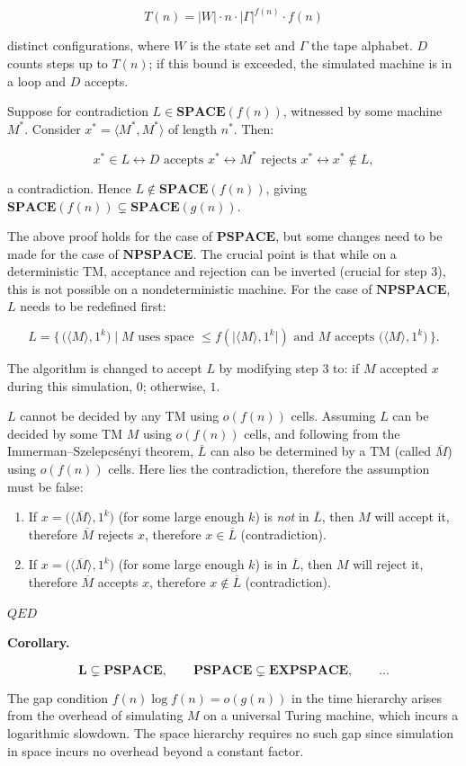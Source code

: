 \documentclass[12pt,a4paper,openany]{article}
\begin{document}
\[
T(n) = |W| \cdot n \cdot |\Gamma|^{f(n)} \cdot f(n)
\]

distinct configurations, where $W$ is the state set and $\Gamma$ the tape alphabet.
$D$ counts steps up to $T(n)$; if this bound is exceeded, the simulated machine
is in a loop and $D$ accepts.

Suppose for contradiction $L \in \mathbf{SPACE}(f(n))$, witnessed by some machine $M^*$.
Consider $x^* = \langle M^*, M^* \rangle$ of length $n^*$. Then:

\[
x^* \in L \leftrightarrow D \text{ accepts } x^* \leftrightarrow M^* \text{ rejects } x^* \leftrightarrow x^* \notin L,
\]

a contradiction. Hence $L \notin \mathbf{SPACE}(f(n))$, giving
$\mathbf{SPACE}(f(n)) \subsetneq \mathbf{SPACE}(g(n))$.

The above proof holds for the case of $\mathbf{PSPACE}$, but some changes need
to be made for the case of $\mathbf{NPSPACE}$. The crucial point is that while
on a deterministic TM, acceptance and rejection can be inverted (crucial for
step 3), this is not possible on a nondeterministic machine.
For the case of $\mathbf{NPSPACE}$, $L$ needs to be redefined first:

\[
L = \Big\{\, \big(\langle M \rangle, 1^k\big)  \mid
M \text{ uses space } \leq f\!\left(\big|\langle M \rangle, 1^k\big|\right)
\text{ and } M \text{ accepts } \big(\langle M \rangle, 1^k\big) \,\Big\}.
\]

The algorithm is changed to accept $L$ by modifying step 3 to: if $M$ accepted
$x$ during this simulation, $0$; otherwise, $1$.

$L$ cannot be decided by any TM using $o(f(n))$ cells. Assuming $L$ can be
decided by some TM $M$ using $o(f(n))$ cells, and following from the
Immerman--Szelepcs\'enyi theorem, $\overline{L}$ can also be determined by a
TM (called $\overline{M}$) using $o(f(n))$ cells. Here lies the contradiction,
therefore the assumption must be false:

\begin{enumerate}
    \item If $x = \big(\langle \overline{M} \rangle, 1^k\big)$ (for some large
    enough $k$) is \emph{not} in $\overline{L}$, then $M$ will accept it,
    therefore $\overline{M}$ rejects $x$, therefore $x \in \overline{L}$
    (contradiction).
    \item If $x = \big(\langle \overline{M} \rangle, 1^k\big)$ (for some large
    enough $k$) is in $\overline{L}$, then $M$ will reject it, therefore
    $\overline{M}$ accepts $x$, therefore $x \notin \overline{L}$
    (contradiction).
\end{enumerate}

\hfill $QED$

\bigskip

\textbf{Corollary.}

\[
\mathbf{L} \subsetneq \mathbf{PSPACE},
\qquad
\mathbf{PSPACE} \subsetneq \mathbf{EXPSPACE},
\qquad \ldots
\]

The gap condition $f(n)\log f(n) = o(g(n))$ in the time hierarchy
arises from the overhead of simulating $M$ on a universal Turing machine, which
incurs a logarithmic slowdown. The space hierarchy requires no such gap since
simulation in space incurs no overhead beyond a constant factor.
\end{document}
